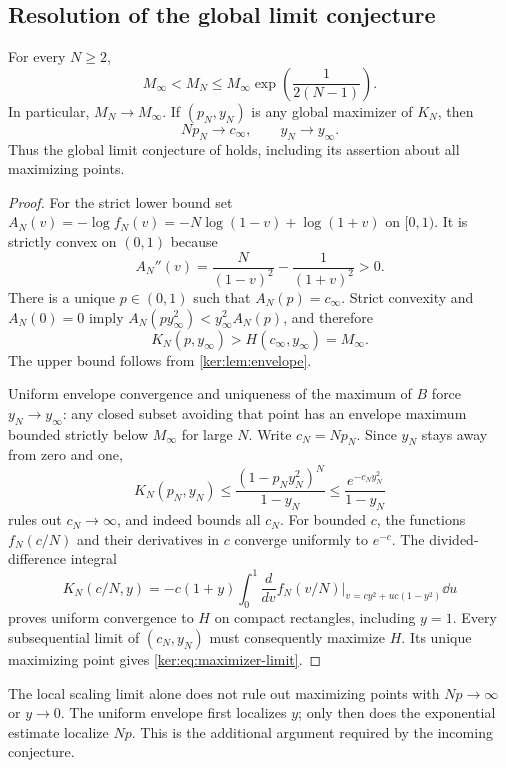 \subsection{Resolution of the global limit conjecture}
\begin{theorem}\label{ker:thm:limit}
For every $N\ge2$,
\begin{equation}\label{ker:eq:two-sided}
 M_\infty<M_N\le M_\infty
                  \exp\!\left(\frac1{2(N-1)}\right).
\end{equation}
In particular, $M_N\to M_\infty$. If $(p_N,y_N)$ is any global
maximizer of $K_N$, then
\begin{equation}\label{ker:eq:maximizer-limit}
 Np_N\longrightarrow c_\infty,\qquad
 y_N\longrightarrow y_\infty.
\end{equation}
Thus the global limit conjecture of \cite[Section 8, \texttt{conj:limit}]{IncomingSharp}
holds, including its assertion about all maximizing points.
\end{theorem}
\begin{proof}
For the strict lower bound set
$A_N(v)=-\log f_N(v)=-N\log(1-v)+\log(1+v)$ on $[0,1)$.
It is strictly convex on $(0,1)$ because
\[
 A_N''(v)=\frac{N}{(1-v)^2}-\frac1{(1+v)^2}>0.
\]
There is a unique $p\in(0,1)$ such that $A_N(p)=c_\infty$.
Strict convexity and $A_N(0)=0$ imply
$A_N(py_\infty^2)<y_\infty^2 A_N(p)$, and therefore
\[
 K_N(p,y_\infty)>H(c_\infty,y_\infty)=M_\infty.
\]
The upper bound follows from \cref{ker:lem:envelope}.

Uniform envelope convergence and uniqueness of the maximum of $B$
force $y_N\to y_\infty$: any closed subset avoiding that point has
an envelope maximum bounded strictly below $M_\infty$ for large $N$.
Write $c_N=Np_N$. Since $y_N$ stays away from zero and one,
\[
 K_N(p_N,y_N)\le\frac{(1-p_Ny_N^2)^N}{1-y_N}
              \le\frac{e^{-c_Ny_N^2}}{1-y_N}
\]
rules out $c_N\to\infty$, and indeed bounds all $c_N$.
For bounded $c$, the functions $f_N(c/N)$ and their derivatives in
$c$ converge uniformly to $e^{-c}$. The divided-difference integral
\[
 K_N(c/N,y)=-c(1+y)\int_0^1
   \frac{d}{dv}f_N(v/N)\bigg|_{v=cy^2+uc(1-y^2)}\dd u
\]
proves uniform convergence to $H$ on compact rectangles, including
$y=1$. Every subsequential limit of $(c_N,y_N)$ must consequently
maximize $H$. Its unique maximizing point gives
\eqref{ker:eq:maximizer-limit}.
\end{proof}

\begin{remark}
The local scaling limit alone does not rule out maximizing points with
$Np\to\infty$ or $y\to0$. The uniform envelope first localizes $y$;
only then does the exponential estimate localize $Np$. This is the
additional argument required by the incoming conjecture.
\end{remark}

